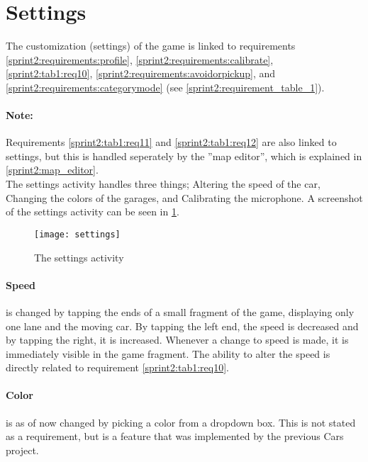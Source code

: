 \section{Settings}

The customization (settings) of the game is linked to requirements \ref{sprint2:requirements:profile}, \ref{sprint2:requirements:calibrate}, \ref{sprint2:tab1:req10}, \ref{sprint2:requirements:avoidorpickup}, and \ref{sprint2:requirements:categorymode} (see \cref{sprint2:requirement_table_1}).

\paragraph{Note:} Requirements \ref{sprint2:tab1:req11} and \ref{sprint2:tab1:req12} are also linked to settings, but this is handled seperately by the ''map editor'', which is explained in \cref{sprint2:map_editor}.\\

\noindent
The settings activity handles three things; Altering the speed of the car, Changing the colors of the garages, and Calibrating the microphone.
A screenshot of the settings activity can be seen in \cref{sprint2:settings:fig}.

\begin{center}
\begin{figure}
\texttt{[image: settings]}
\caption{The settings activity}
\label{sprint2:settings:fig}
\end{figure}
\end{center}

\paragraph{Speed} is changed by tapping the ends of a small fragment of the game, displaying only one lane and the moving car.
By tapping the left end, the speed is decreased and by tapping the right, it is increased.
Whenever a change to speed is made, it is immediately visible in the game fragment.
The ability to alter the speed is directly related to requirement \ref{sprint2:tab1:req10}.

\paragraph{Color} is as of now changed by picking a color from a dropdown box.
This is not stated as a requirement, but is a feature that was implemented by the previous Cars project.

